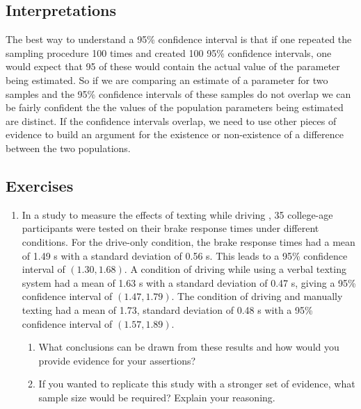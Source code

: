 \documentclass[
]{book}
\providecommand{\tightlist}{%
  \setlength{\itemsep}{0pt}\setlength{\parskip}{0pt}}
\theoremstyle{definition}
\theoremstyle{definition}
\theoremstyle{definition}
\theoremstyle{definition}
\theoremstyle{remark}
\begin{document}
\hypertarget{interpretations}{%
\subsection{Interpretations}\label{interpretations}}

The best way to understand a 95\% confidence interval is that if one repeated the sampling procedure 100 times and created 100 95\% confidence intervals, one would expect that 95 of these would contain the actual value of the parameter being estimated. So if we are comparing an estimate of a parameter for two samples and the 95\% confidence intervals of these samples do not overlap we can be fairly confident the the values of the population parameters being estimated are distinct. If the confidence intervals overlap, we need to use other pieces of evidence to build an argument for the existence or non-existence of a difference between the two populations.

\hypertarget{exercises-70}{%
\subsection{Exercises}\label{exercises-70}}

\begin{enumerate}
\def\labelenumi{\arabic{enumi}.}
\item
  In a study to measure the effects of texting while driving \citep{He2014}, 35 college-age participants were tested on their brake response times under different conditions. For the drive-only condition, the brake response times had a mean of 1.49 s with a standard deviation of 0.56 s. This leads to a 95\% confidence interval of \((1.30,1.68)\). A condition of driving while using a verbal texting system had a mean of 1.63 s with a standard deviation of 0.47 s, giving a 95\% confidence interval of \((1.47,1.79)\). The condition of driving and manually texting had a mean of 1.73, standard deviation of 0.48 s with a 95\% confidence interval of \((1.57, 1.89)\).

  \begin{enumerate}
  \def\labelenumii{\alph{enumii}.}
  \tightlist
  \item
    What conclusions can be drawn from these results and how would you provide evidence for your assertions?
  \item
    If you wanted to replicate this study with a stronger set of evidence, what sample size would be required? Explain your reasoning.
  \end{enumerate}
\end{enumerate}
\end{document}
